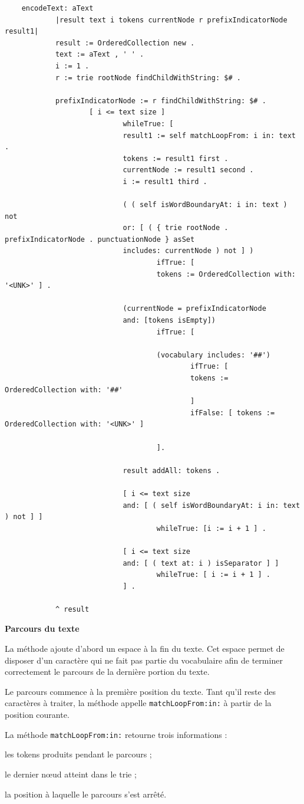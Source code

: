 \documentclass[12pt,a4paper]{report}
\begin{document}
	\begin{verbatim}
	encodeText: aText
			|result text i tokens currentNode r prefixIndicatorNode result1|
			result := OrderedCollection new .
			text := aText , ' ' .
			i := 1 .
			r := trie rootNode findChildWithString: $# .
			
			prefixIndicatorNode := r findChildWithString: $# .
					[ i <= text size ]
							whileTrue: [
							result1 := self matchLoopFrom: i in: text .
							tokens := result1 first .
							currentNode := result1 second .
							i := result1 third .
							
							( ( self isWordBoundaryAt: i in: text ) not
							or: [ ( { trie rootNode . prefixIndicatorNode . punctuationNode } asSet 
							includes: currentNode ) not ] )
									ifTrue: [
									tokens := OrderedCollection with:  '<UNK>' ] .
									
							(currentNode = prefixIndicatorNode
							and: [tokens isEmpty])
									ifTrue: [
									
									(vocabulary includes: '##')
											ifTrue: [
											tokens := OrderedCollection with: '##' 
											]
											ifFalse: [ tokens := OrderedCollection with: '<UNK>' ]
															
									].
									
							result addAll: tokens .
							
							[ i <= text size
							and: [ ( self isWordBoundaryAt: i in: text ) not ] ]
									whileTrue: [i := i + 1 ] .
									
							[ i <= text size
							and: [ ( text at: i ) isSeparator ] ]
									whileTrue: [ i := i + 1 ] .		 
							] .
				
			^ result 
	\end{verbatim}
	
	\textbf{Parcours du texte}
	
	La méthode ajoute d'abord un espace à la fin du texte.
	Cet espace permet de disposer d'un caractère qui ne fait pas partie du vocabulaire afin de terminer correctement le parcours de la dernière portion du texte.
	
	Le parcours commence à la première position du texte. Tant qu'il reste des caractères à traiter, la méthode appelle \texttt{matchLoopFrom:in:} à partir de la position courante.
	
	La méthode \texttt{matchLoopFrom:in:} retourne trois informations :
	
	\begin{itemizeFB}
		\item les tokens produits pendant le parcours ;
		\item le dernier nœud atteint dans le trie ;
		\item la position à laquelle le parcours s'est arrêté.
	\end{itemizeFB}
	
\end{document}
